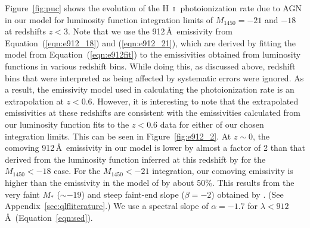 \documentclass[fleqn,usenatbib]{mnras}
\def\HI{\hbox{H~$\scriptstyle\rm I$}}
\begin{document}
Figure~\ref{fig:puc} shows the evolution of the \HI\ photoionization
rate due to AGN in our model for luminosity function integration
limits of $M_{1450}=-21$ and $-18$ at redshifts $z<3$.  Note that we
use the 912\,\AA\ emissivity from Equation~(\ref{eqn:e912_18}) and
(\ref{eqn:e912_21}), which are derived by fitting the model from
Equation~(\ref{eqn:e912fit}) to the emissivities obtained from
luminosity functions in various redshift bins.  While doing this, as
discussed above, redshift bins that were interpreted as being affected
by systematic errors were ignored.  As a result, the emissivity model
used in calculating the photoionization rate is an extrapolation at
$z<0.6$.  However, it is interesting to note that the extrapolated
emissivities at these redshifts are consistent with the emissivities
calculated from our luminosity function fits to the $z<0.6$ data for
either of our chosen integration limits.  This can be seen in
Figure~\ref{fig:e912_2}.  At $z\sim 0$, the comoving
912\,\AA\ emissivity in our model is lower by almost a factor of 2
than that derived from the luminosity function inferred at this
redshift by \citet{2009A&A...507..781S} for the $M_{1450}<-18$ case.
For the $M_{1450}<-21$ integration, our comoving emissivity is higher
than the emissivity in the model of \citet{2009A&A...507..781S} by
about 50\%.  This results from the very faint $M_*$ ($\sim -19$) and
steep faint-end slope ($\beta=-2$) obtained by
\citet{2009A&A...507..781S}.  (See Appendix~\ref{sec:qlfliterature}.)
We use a spectral slope of $\alpha=-1.7$ for
$\lambda<912$\,\AA\ (Equation~\ref{eqn:sed}).
\end{document}
